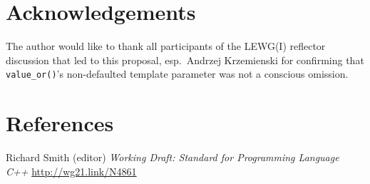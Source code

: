 \documentclass[11pt]{article}
\begin{document}
\section{Acknowledgements}

The author would like to thank all participants of the LEWG(I)
reflector discussion that led to this proposal, esp.\ Andrzej
Krzemienski for confirming that \texttt{value\_or()}'s non-defaulted
template parameter was not a conscious omission.

\section{References}
\renewcommand{\section}[2]{}%
\begin{thebibliography}{9}
  Richard Smith (editor)\newline
  \emph{Working Draft: Standard for Programming Language C++}\newline
  \url{http://wg21.link/N4861}
\end{thebibliography}
\end{document}
